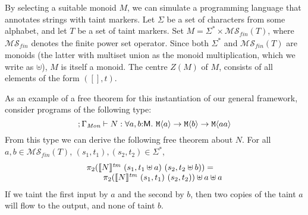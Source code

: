 \begin{example}
  By selecting a suitable monoid $M$, we can simulate a programming
  language that annotates strings with taint markers. Let $\Sigma$ be
  a set of characters from some alphabet, and let $T$ be a set of
  taint markers. Set $M = \Sigma^* \times
  \mathcal{MS}_{\mathit{fin}}(T)$, where $\mathcal{MS}_{\mathit{fin}}$
  denotes the finite power set operator. Since both $\Sigma^*$ and
  $\mathcal{MS}_{\mathit{fin}}(T)$ are monoids (the latter with
  multiset union as the monoid multiplication, which we write as
  $\uplus$), $M$ is itself a monoid. The centre $Z(M)$ of $M$, 
  consists of all elements of the form $([], t)$.

  As an example of a free theorem for this instantiation of our
  general framework, consider programs of the following type:
  \begin{displaymath}
    ; \Gamma_{\textit{Mon}} \vdash N : \forall a,b\mathord:\mathsf{M}.\ \textup{\texttt{M}}\langle a \rangle \to \textup{\texttt{M}}\langle b \rangle \to \textup{\texttt{M}}\langle aa \rangle
  \end{displaymath}
  From this type we can derive the following free theorem about
  $N$. For all $a, b \in \mathcal{MS}_{\mathit{fin}}(T)$, $(s_1,t_1),
  (s_2,t_2) \in \Sigma^*$,
  \begin{displaymath}
    \begin{array}{l}
      \pi_2(\llbracket N \rrbracket^{\mathit{tm}}\ (s_1,t_1 \uplus a)\ (s_2,t_2 \uplus b)) = \\
      \hspace{2em}\pi_2(\llbracket N \rrbracket^{\mathit{tm}}\ (s_1,t_1)\ (s_2,t_2)) \uplus a \uplus a
    \end{array}
  \end{displaymath}
  If we taint the first input by $a$ and the second by $b$, then two
  copies of the taint $a$ will flow to the output, and none of taint
  $b$.
\end{example}






